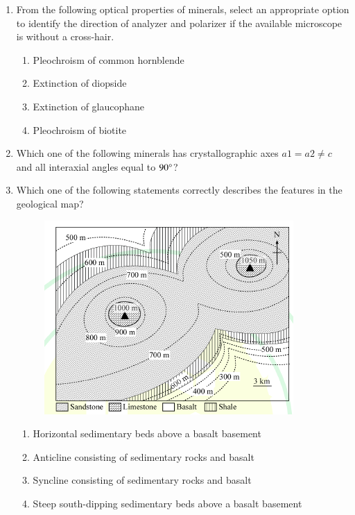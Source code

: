 \documentclass[journal,12pt,onecolumn]{IEEEtran}
\theoremstyle{remark}
\begin{document}
\begin{enumerate}
\item From the following optical properties of minerals, select an appropriate option to identify the direction of analyzer and polarizer if the available microscope is without a cross-hair. \hfill{}
\begin{enumerate}
    \item Pleochroism of common hornblende
    \item Extinction of diopside
    \item Extinction of glaucophane
    \item Pleochroism of biotite
\end{enumerate}

\item Which one of the following minerals has crystallographic axes $a1=a2 \ne c$ and all interaxial angles equal to $90\degree$? \hfill{}
\begin{enumerate}
\end{enumerate}

\item Which one of the following statements correctly describes the features in the geological map?
\begin{figure}[H]
    \centering
    \includegraphics[width=0.8\columnwidth]{figs/fig7.png}
    \caption{}
    \label{fig:q35}
\end{figure}
\hfill{}
\begin{enumerate}
    \item Horizontal sedimentary beds above a basalt basement
    \item Anticline consisting of sedimentary rocks and basalt
    \item Syncline consisting of sedimentary rocks and basalt
    \item Steep south-dipping sedimentary beds above a basalt basement
\end{enumerate}


\end{enumerate}
\end{document}
